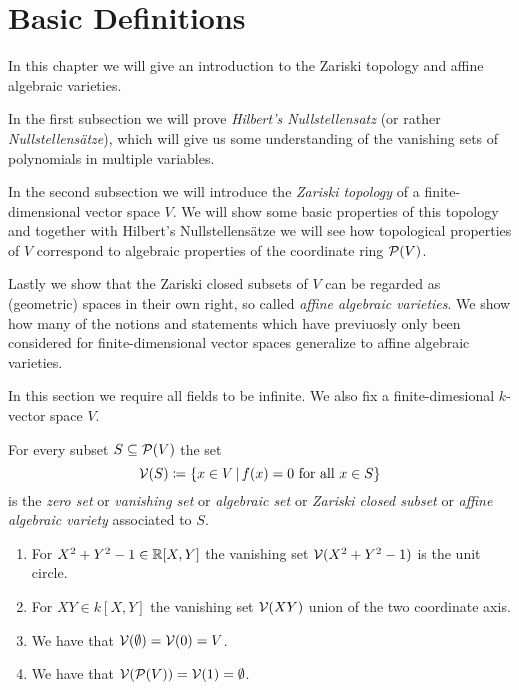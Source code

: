 \section{Basic Definitions}




\begin{fluff}
  In this chapter we will give an introduction to the Zariski topology and affine algebraic varieties.
  
  In the first subsection we will prove \emph{Hilbert’s Nullstellensatz} (or rather \emph{Nullstellensätze}), which will give us some understanding of the vanishing sets of polynomials in multiple variables.
  
  In the second subsection we will introduce the \emph{Zariski topology} of a finite-dimensional vector space $V$.
  We will show some basic properties of this topology and together with Hilbert’s Nullstellensätze we will see how topological properties of $V$ correspond to algebraic properties of the coordinate ring $\mathcal{P}(V)$.
  
  Lastly we show that the Zariski closed subsets of $V$ can be regarded as (geometric) spaces in their own right, so called \emph{affine algebraic varieties}.
  We show how many of the notions and statements which have previuosly only been considered for finite-dimensional vector spaces generalize to affine algebraic varieties.
\end{fluff}


\begin{conventions}
  In this section we require all fields to be infinite.
  We also fix a finite-dimesional $k$-vector space $V$.
\end{conventions}


\begin{definition}
  For every subset $S \subseteq \mathcal{P}(V)$ the set
  \[
              \mc{V}(S)
    \defined  \{
                x \in V
              \suchthat
                \text{$f(x) = 0$ for all $x \in S$}
              \}
  \]
  is the \emph{zero set} or \emph{vanishing set} or \emph{algebraic set} or \emph{Zariski closed subset} or \emph{affine algebraic variety} associated to $S$.
\end{definition}


\begin{example}
  \label{example: examples of algebraic subsets}
  \leavevmode
  \begin{enumerate}
    \item
      For $X^2 + Y^2 - 1 \in \mathbb{R}[X,Y]$ the vanishing set $\mathcal{V}(X^2 + Y^2 - 1)$ is the unit circle.
    \item
      For $XY \in k[X,Y]$ the vanishing set $\mathcal{V}(XY)$ union of the two coordinate axis.
    \item
      We have that $\mathcal{V}(\emptyset) = \mathcal{V}(0) = V$.
    \item
      We have that $\mathcal{V}(\mathcal{P}(V)) = \mathcal{V}(1) = \emptyset$.
  \end{enumerate}
\end{example}


